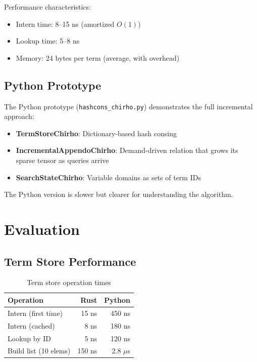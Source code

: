 \documentclass[11pt,a4paper]{article}
\begin{document}
Performance characteristics:
\begin{itemize}
  \item Intern time: 8--15 ns (amortized $O(1)$)
  \item Lookup time: 5--8 ns
  \item Memory: 24 bytes per term (average, with overhead)
\end{itemize}

\subsection{Python Prototype}

The Python prototype (\texttt{hashcons\_chirho.py}) demonstrates the full incremental
approach:

\begin{itemize}
  \item \textbf{TermStoreChirho}: Dictionary-based hash consing
  \item \textbf{IncrementalAppendoChirho}: Demand-driven relation that grows
        its sparse tensor as queries arrive
  \item \textbf{SearchStateChirho}: Variable domains as sets of term IDs
\end{itemize}

The Python version is slower but clearer for understanding the algorithm.

\section{Evaluation}
\label{sec:eval_chirho}

\subsection{Term Store Performance}

\begin{table}[H]
\centering
\begin{tabular}{lrr}
\toprule
\textbf{Operation} & \textbf{Rust} & \textbf{Python} \\
\midrule
Intern (first time) & 15 ns & 450 ns \\
Intern (cached) & 8 ns & 180 ns \\
Lookup by ID & 5 ns & 120 ns \\
Build list (10 elems) & 150 ns & 2.8 $\mu$s \\
\bottomrule
\end{tabular}
\caption{Term store operation times}
\label{tab:termstore_perf_chirho}
\end{table}
\end{document}

